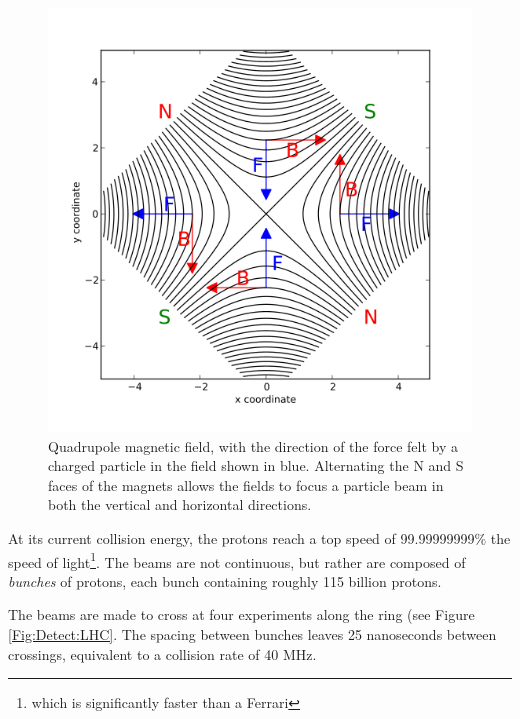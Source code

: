 \begin{figure}[h!]
    \centering
        \includegraphics[width=\textwidth]{F3/quadpole}
        \caption{Quadrupole magnetic field, with the direction of the force felt by a charged particle in the field shown in blue. Alternating the N and S faces of the magnets allows the fields to focus a particle beam in both the vertical and horizontal directions.}
        \label{Fig:Detect:QuadPole}
\end{figure}
At its current collision energy, the protons reach a top speed of 99.99999999$\%$ the speed of light\footnote{which is significantly faster than a Ferrari}. The beams are not continuous, but rather are composed of \textit{bunches} of protons, each bunch containing roughly 115 billion protons.

The beams are made to cross at four experiments along the ring (see Figure \ref{Fig:Detect:LHC}. The spacing between bunches leaves 25 nanoseconds between crossings, equivalent to a collision rate of 40 MHz.

